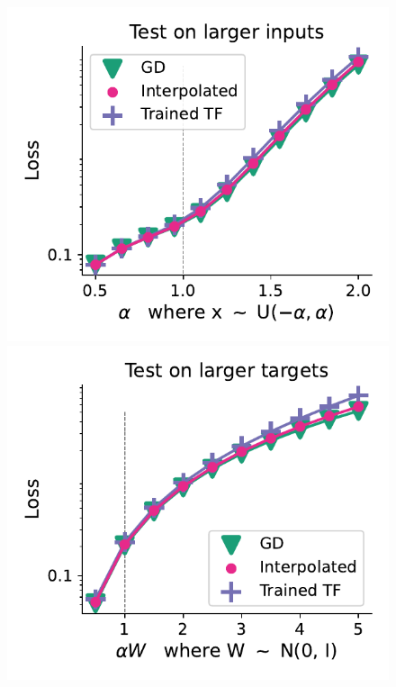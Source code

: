 \documentclass{article}
\theoremstyle{plain}
\theoremstyle{definition}
\theoremstyle{remark}
\begin{document}
\begin{figure}
\begin{center}
\begin{minipage}{.24\textwidth}
\begin{center}
  \end{center}
  \vspace{-10pt}
\end{minipage}
\begin{minipage}{.24\textwidth}
  \centering
  \begin{center}
    \includegraphics[width=1.\textwidth]{Final_figures/cycle/2048/normal_28.pdf}
  \end{center}
  \vspace{-10pt}
\end{minipage}
\begin{minipage}{.24\textwidth}
  \centering
  \begin{center}
    \includegraphics[width=1.\textwidth]{Final_figures/cycle/2048/normal_27.pdf}
  \end{center}
  \vspace{-10pt}
\end{minipage}
\end{center}


\end{figure}
\end{document}

